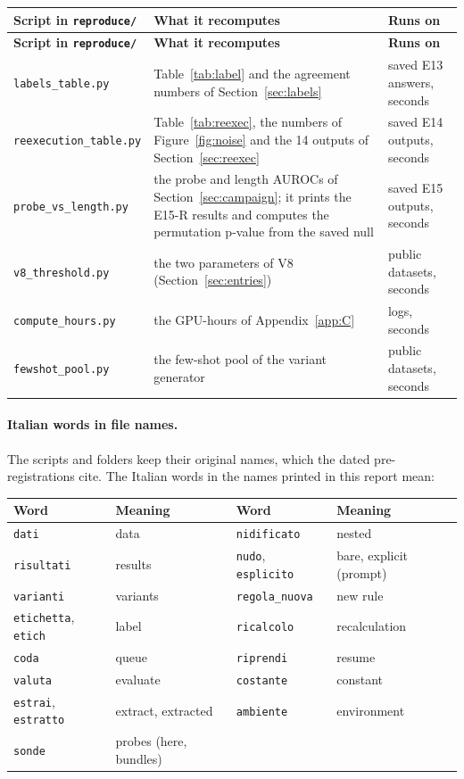 {\small\setlength{\tabcolsep}{4pt}
\begin{longtable}{L{3.7cm}L{6.2cm}L{3.0cm}}
\toprule
\textbf{Script in \texttt{reproduce/}} & \textbf{What it recomputes} & \textbf{Runs on} \\
\midrule
\endfirsthead
\toprule
\textbf{Script in \texttt{reproduce/}} & \textbf{What it recomputes} & \textbf{Runs on} \\
\midrule
\endhead
\bottomrule
\endlastfoot
\texttt{labels\_table.py} & Table~\ref{tab:label} and the agreement numbers of Section~\ref{sec:labels} & saved E13 answers, seconds \\
\texttt{reexecution\_table.py} & Table~\ref{tab:reexec}, the numbers of Figure~\ref{fig:noise} and the 14 outputs of Section~\ref{sec:reexec} & saved E14 outputs, seconds \\
\texttt{probe\_vs\_length.py} & the probe and length AUROCs of Section~\ref{sec:campaign}; it prints the E15-R results and computes the permutation p-value from the saved null & saved E15 outputs, seconds \\
\texttt{v8\_threshold.py} & the two parameters of V8 (Section~\ref{sec:entries}) & public datasets, seconds \\
\texttt{compute\_hours.py} & the GPU-hours of Appendix~\ref{app:C} & logs, seconds \\
\texttt{fewshot\_pool.py} & the few-shot pool of the variant generator & public datasets, seconds \\
\end{longtable}
}

\paragraph{Italian words in file names.} The scripts and folders keep their original names, which the dated pre-registrations cite. The Italian words in the names printed in this report mean:

{\small\setlength{\tabcolsep}{6pt}
\begin{tabular}{@{}llll@{}}
\toprule
\textbf{Word} & \textbf{Meaning} & \textbf{Word} & \textbf{Meaning} \\
\midrule
\texttt{dati} & data & \texttt{nidificato} & nested \\
\texttt{risultati} & results & \texttt{nudo}, \texttt{esplicito} & bare, explicit (prompt) \\
\texttt{varianti} & variants & \texttt{regola\_nuova} & new rule \\
\texttt{etichetta}, \texttt{etich} & label & \texttt{ricalcolo} & recalculation \\
\texttt{coda} & queue & \texttt{riprendi} & resume \\
\texttt{valuta} & evaluate & \texttt{costante} & constant \\
\texttt{estrai}, \texttt{estratto} & extract, extracted & \texttt{ambiente} & environment \\
\texttt{sonde} & probes (here, bundles) & & \\
\bottomrule
\end{tabular}}

